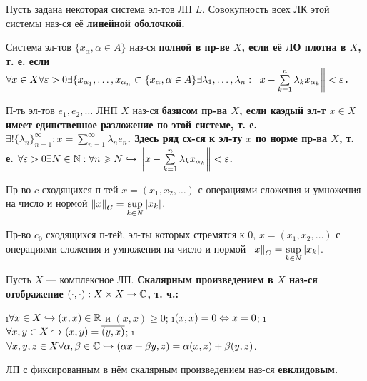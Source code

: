 \begin{defn}
Пусть задана некоторая система эл-тов ЛП $L$. Совокупность всех ЛК этой системы наз-ся её \bf{линейной оболочкой}.
\end{defn}

\begin{defn}
Система эл-тов $\{x_\alpha, \alpha \in A\}$ наз-ся \bf{полной} в пр-ве $X$, если её ЛО плотна в $X$, т. е. если $\forall x \in X \forall \varepsilon > 0 \exists \{x_{\alpha_1}, \dots, x_{\alpha_n} \subset \{x_\alpha, \alpha \in A\} \exists \lambda_1, \dots, \lambda_n: \left\lVert x-\sum\limits_{k=1}^n \lambda_k x_{\alpha_k}\right\rVert < \varepsilon$.
\end{defn}

\begin{defn}
П-ть эл-тов $e_1, e_2, \dots$ ЛНП $X$ наз-ся \bf{базисом} пр-ва $X$, если каэдый эл-т $x \in X$ имеет единственное разложение по этой системе, т. е. $\exists ! \{\lambda_n\}_{n=1}^\infty: x = \sum\limits_{n=1}^\infty \lambda_n e_n$. Здесь ряд сх-ся к эл-ту $x$ по норме пр-ва $X$, т. е. $\forall \varepsilon > 0 \exists N \in \mathbb{N}: \forall n \geqslant N \hookrightarrow \left\lVert x - \sum\limits_{k=1}^n \lambda_k x_{\alpha_k}\right\rVert < \varepsilon$.
\end{defn}

\begin{defn}
Пр-во $c$ сходящихся п-тей $x=(x_1, x_2, \dots)$ с операциями сложения и умножения на число и нормой $\left\lVert x\right\rVert_C = \sup\limits_{k \in N} |x_k|$.
\end{defn}

\begin{defn}
Пр-во $c_0$ сходящихся п-тей, эл-ты которых стремятся к 0, $x=(x_1, x_2, \dots)$ с операциями сложения и умножения на число и нормой $\left\lVert x\right\rVert_C = \sup\limits_{k \in N} |x_k|$.
\end{defn}

\begin{defn}
Пусть $X$ --- комплексное ЛП. \bf{Скалярным произведением} в $X$ наз-ся отображение $(\cdot, \cdot): X \times X \rightarrow \mathbb{C}$, т. ч.:
\begin{enumerate}
\i $\forall x \in X \hookrightarrow (x, x) \in \mathbb{R}$ и $(x, x) \ge 0$;
\i $(x, x)=0 \Leftrightarrow x = 0$;
\i $\forall x, y \in X \hookrightarrow (x, y) = \overline{(y, x)}$;
\i $\forall x, y, z \in X \forall \alpha, \beta \in \mathbb{C} \hookrightarrow (\alpha x + \beta y, z) = \alpha (x, z) + \beta(y, z)$.
\end{enumerate}
\end{defn}

\begin{defn}
ЛП с фиксированным в нём скалярным произведением наз-ся \bf{евклидовым}.
\end{defn}


